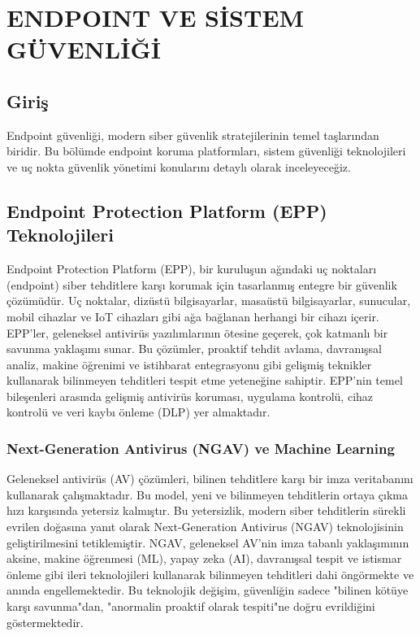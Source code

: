 ﻿\chapter{ENDPOINT VE SİSTEM GÜVENLİĞİ}

\section*{Giriş}
Endpoint güvenliği, modern siber güvenlik stratejilerinin temel taşlarından biridir. Bu bölümde endpoint koruma platformları, sistem güvenliği teknolojileri ve uç nokta güvenlik yönetimi konularını detaylı olarak inceleyeceğiz.

\section{Endpoint Protection Platform (EPP) Teknolojileri}

Endpoint Protection Platform (EPP), bir kuruluşun ağındaki uç noktaları (endpoint) siber tehditlere karşı korumak için tasarlanmış entegre bir güvenlik çözümüdür. Uç noktalar, dizüstü bilgisayarlar, masaüstü bilgisayarlar, sunucular, mobil cihazlar ve IoT cihazları gibi ağa bağlanan herhangi bir cihazı içerir. EPP'ler, geleneksel antivirüs yazılımlarının ötesine geçerek, çok katmanlı bir savunma yaklaşımı sunar. Bu çözümler, proaktif tehdit avlama, davranışsal analiz, makine öğrenimi ve istihbarat entegrasyonu gibi gelişmiş teknikler kullanarak bilinmeyen tehditleri tespit etme yeteneğine sahiptir. EPP'nin temel bileşenleri arasında gelişmiş antivirüs koruması, uygulama kontrolü, cihaz kontrolü ve veri kaybı önleme (DLP) yer almaktadır.

\subsection{Next-Generation Antivirus (NGAV) ve Machine Learning}

Geleneksel antivirüs (AV) çözümleri, bilinen tehditlere karşı bir imza veritabanını kullanarak çalışmaktadır. Bu model, yeni ve bilinmeyen tehditlerin ortaya çıkma hızı karşısında yetersiz kalmıştır. Bu yetersizlik, modern siber tehditlerin sürekli evrilen doğasına yanıt olarak Next-Generation Antivirus (NGAV) teknolojisinin geliştirilmesini tetiklemiştir. NGAV, geleneksel AV'nin imza tabanlı yaklaşımının aksine, makine öğrenmesi (ML), yapay zeka (AI), davranışsal tespit ve istismar önleme gibi ileri teknolojileri kullanarak bilinmeyen tehditleri dahi öngörmekte ve anında engellemektedir. Bu teknolojik değişim, güvenliğin sadece "bilinen kötüye karşı savunma"dan, "anormalin proaktif olarak tespiti"ne doğru evrildiğini göstermektedir.

